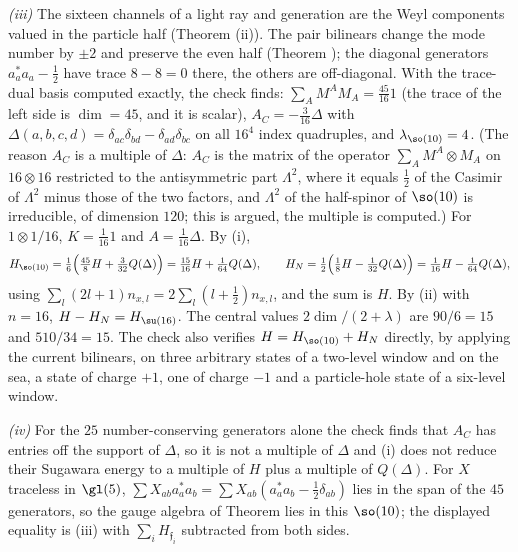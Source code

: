 \emph{(iii)} The sixteen channels of a light ray and generation are the Weyl components valued in the particle half (Theorem (ii)). The pair bilinears change the mode number by $\pm 2$ and preserve the even half (Theorem ); the diagonal generators $a^{*}_{a}a_{a} - \tfrac12$ have trace $8 - 8 = 0$ there, the others are off-diagonal. With the trace-dual basis computed exactly, the check finds: $\sum_{A}M^{A}M_{A} = \tfrac{45}{16}1$ (the trace of the left side is $\dim = 45$, and it is scalar), $A_{C} = -\tfrac{3}{16}\Delta$ with $\Delta(a,b,c,d) = \delta_{ac}\delta_{bd} - \delta_{ad}\delta_{bc}$ on all $16^{4}$ index quadruples, and $\lambda_{\so(10)} = 4$. (The reason $A_{C}$ is a multiple of $\Delta$: $A_{C}$ is the matrix of the operator $\sum_{A}M^{A}\otimes M_{A}$ on $16\otimes 16$ restricted to the antisymmetric part $\Lambda^{2}$, where it equals $\tfrac12$ of the Casimir of $\Lambda^{2}$ minus those of the two factors, and $\Lambda^{2}$ of the half-spinor of $\so(10)$ is irreducible, of dimension $120$; this is argued, the multiple is computed.) For $1\otimes 1/16$, $K = \tfrac1{16}1$ and $A = \tfrac{1}{16}\Delta$. By (i),
\[
H_{\so(10)} = \tfrac16\Bigl(\tfrac{45}{8}H + \tfrac{3}{32}Q(\Delta)\Bigr) = \tfrac{15}{16}H + \tfrac{1}{64}Q(\Delta), \qquad H_{N} = \tfrac12\Bigl(\tfrac18 H - \tfrac{1}{32}Q(\Delta)\Bigr) = \tfrac{1}{16}H - \tfrac{1}{64}Q(\Delta),
\]
using $\sum_{l}(2l + 1)n_{x,l} = 2\sum_{l}(l + \tfrac12)n_{x,l}$, and the sum is $H$. By (ii) with $n = 16$, $H - H_{N} = H_{\su(16)}$. The central values $2\dim/(2 + \lambda)$ are $90/6 = 15$ and $510/34 = 15$. The check also verifies $H = H_{\so(10)} + H_{N}$ directly, by applying the current bilinears, on three arbitrary states of a two-level window and on the sea, a state of charge $+1$, one of charge $-1$ and a particle-hole state of a six-level window.

\emph{(iv)} For the $25$ number-conserving generators alone the check finds that $A_{C}$ has entries off the support of $\Delta$, so it is not a multiple of $\Delta$ and (i) does not reduce their Sugawara energy to a multiple of $H$ plus a multiple of $Q(\Delta)$. For $X$ traceless in $\gl(5)$, $\sum X_{ab}a^{*}_{a}a_{b} = \sum X_{ab}(a^{*}_{a}a_{b} - \tfrac12\delta_{ab})$ lies in the span of the $45$ generators, so the gauge algebra of Theorem  lies in this $\so(10)$; the displayed equality is (iii) with $\sum_{i}H_{\mathfrak{f}_{i}}$ subtracted from both sides.
